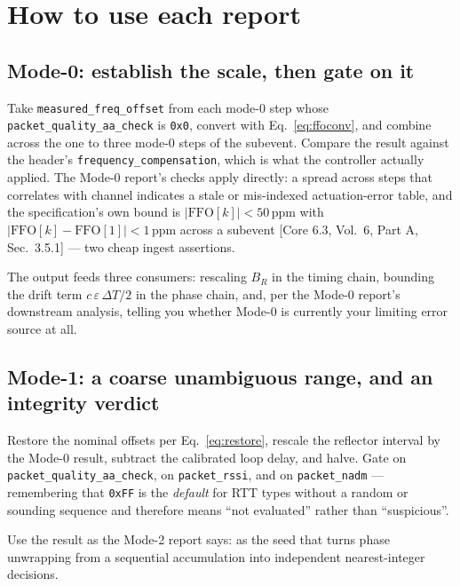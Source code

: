 \documentclass[11pt,a4paper]{article}
\newcommand{\code}[1]{\texttt{\small #1}}
\newcommand{\FFO}{\ensuremath{\mathrm{FFO}}}
\newcommand{\core}[1]{\textcolor{rulegrey}{\small[Core 6.3, #1]}}
\begin{document}
\section{How to use each report}
\label{sec:use}

\subsection{Mode-0: establish the scale, then gate on it}

Take \code{measured\_\allowbreak{}freq\_\allowbreak{}offset} from each mode-0 step whose \code{packet\_\allowbreak{}quality\_\allowbreak{}aa\_\allowbreak{}check} is
\code{0x0}, convert with Eq.~\eqref{eq:ffoconv}, and combine across the one to three mode-0 steps of
the subevent. Compare the result against the header's \code{frequency\_\allowbreak{}compensation}, which is what
the controller actually applied. The Mode-0 report's checks apply directly: a spread across steps
that correlates with channel indicates a stale or mis-indexed actuation-error table, and the
specification's own bound is $|\FFO[k]|<50$\,ppm with $|\FFO[k]-\FFO[1]|<1$\,ppm across a subevent
\core{Vol.\ 6, Part A, Sec.\ 3.5.1} --- two cheap ingest assertions.

The output feeds three consumers: rescaling $B_R$ in the timing chain, bounding the drift term
$c\,\varepsilon\,\Delta T/2$ in the phase chain, and, per the Mode-0 report's downstream analysis,
telling you whether Mode-0 is currently your limiting error source at all.

\subsection{Mode-1: a coarse unambiguous range, and an integrity verdict}

Restore the nominal offsets per Eq.~\eqref{eq:restore}, rescale the reflector interval by the Mode-0
result, subtract the calibrated loop delay, and halve. Gate on
\code{packet\_\allowbreak{}quality\_\allowbreak{}aa\_\allowbreak{}check}, on \code{packet\_\allowbreak{}rssi}, and on \code{packet\_\allowbreak{}nadm} --- remembering
that \code{0xFF} is the \emph{default} for RTT types without a random or sounding sequence and
therefore means ``not evaluated'' rather than ``suspicious''.

Use the result as the Mode-2 report says: as the seed that turns phase unwrapping from a sequential
accumulation into independent nearest-integer decisions.
\end{document}
